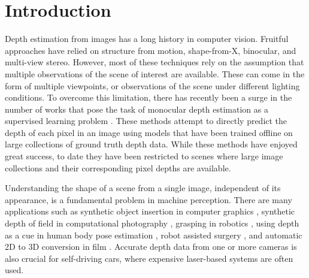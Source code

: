 \documentclass[10pt,twocolumn,letterpaper]{article}
\begin{document}
\section{Introduction}\label{sec:introduction}
Depth estimation from images has a long history in computer vision. 
Fruitful approaches have relied on structure from motion, shape-from-X, binocular, and multi-view stereo. 
However, most of these techniques rely on the assumption that multiple observations of the scene of interest are available.
These can come in the form of multiple viewpoints, or observations of the scene under different lighting conditions. 
To overcome this limitation, there has recently been a surge in the number of works that pose the task of monocular depth estimation as a supervised learning problem \cite{ladicky2014pulling, eigen2014depth, liu2015learning}. 
These methods attempt to directly predict the depth of each pixel in an image using models that have been trained offline on large collections of ground truth depth data. 
While these methods have enjoyed great success, to date they have been restricted to scenes where large image collections and their corresponding pixel depths are available. 


Understanding the shape of a scene from a single image, independent of its appearance, is a fundamental problem in machine perception. 
There are many applications such as synthetic object insertion in computer graphics \cite{karsch2014automatic}, synthetic depth of field in computational photography \cite{Barron2015A}, grasping in robotics \cite{lenz2015deep}, using depth as a cue in human body pose estimation \cite{shotton2013real}, robot assisted surgery \cite{stoyanov2010real}, and automatic 2D to 3D conversion in film \cite{xie2016deep3d}.
Accurate depth data from one or more cameras is also crucial for self-driving cars, where expensive laser-based systems are often used.
\end{document}
